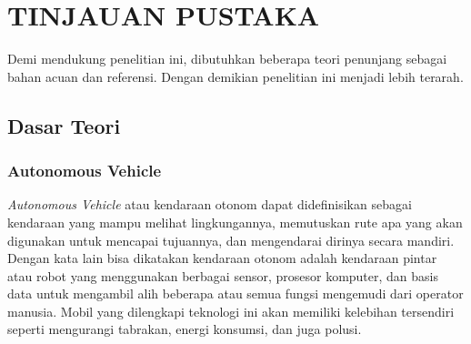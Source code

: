 \chapter{TINJAUAN PUSTAKA}
\label{chap:tinjauanpustaka}


Demi mendukung penelitian ini, dibutuhkan beberapa teori penunjang sebagai bahan acuan dan referensi. Dengan demikian penelitian ini menjadi lebih terarah.

\section{Dasar Teori}
\label{sec:dasarteori}

\subsection{Autonomous Vehicle}

\textit{Autonomous Vehicle} atau kendaraan otonom dapat didefinisikan sebagai kendaraan yang mampu melihat lingkungannya, memutuskan rute apa yang akan digunakan untuk mencapai tujuannya, dan mengendarai dirinya secara mandiri. Dengan kata lain bisa dikatakan kendaraan otonom adalah kendaraan pintar atau robot yang menggunakan berbagai sensor, prosesor komputer, dan basis data untuk mengambil alih beberapa atau semua fungsi mengemudi dari operator manusia. Mobil yang dilengkapi teknologi ini akan memiliki kelebihan tersendiri seperti mengurangi tabrakan, energi konsumsi, dan juga polusi.\cite{cit:autonomous_vehicle_future}

